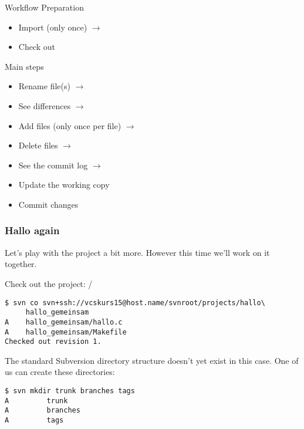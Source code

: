 \begin{frame}{Workflow}
    \windowsframe
    \newlength{\tortoisetab}
    \setlength{\tortoisetab}{50mm}
    Preparation
    \begin{itemize}
        \item Import (only once) \tabto{\tortoisetab}
             $\rightarrow$ 
        \item Check out \tabto{\tortoisetab}
    \end{itemize}

    Main steps
    \begin{itemize}
        \item Rename file(s) \tabto{\tortoisetab}
             $\rightarrow$ 
        \item See differences \tabto{\tortoisetab}
             $\rightarrow$ 
        \item Add files (only once per file) \tabto{\tortoisetab}
             $\rightarrow$ 
        \item Delete files \tabto{\tortoisetab}
             $\rightarrow$ 
        \item See the commit log \tabto{\tortoisetab}
             $\rightarrow$ 
        \item Update the working copy \tabto{\tortoisetab}
        \item Commit changes \tabto{\tortoisetab}
    \end{itemize}
\end{frame}

\begin{frame}[fragile]
    \linuxframe
    \frametitle{Hallo again}
    Let's play with the  project a bit more.  However this
    time we'll work on it together.

    Check out the project: /
\begin{lstlisting}
$ svn co svn+ssh://vcskurs15@host.name/svnroot/projects/hallo\
     hallo_gemeinsam
A    hallo_gemeinsam/hallo.c
A    hallo_gemeinsam/Makefile
Checked out revision 1.
\end{lstlisting}

The standard Subversion directory structure doesn't yet exist in this case.
One of us can create these directories:
\begin{lstlisting}
$ svn mkdir trunk branches tags
A         trunk
A         branches
A         tags
\end{lstlisting}
\end{frame}

